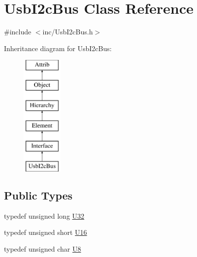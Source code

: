 \hypertarget{classUsbI2cBus}{}\section{Usb\+I2c\+Bus Class Reference}
\label{classUsbI2cBus}


{\ttfamily \#include $<$inc/\+Usb\+I2c\+Bus.\+h$>$}

Inheritance diagram for Usb\+I2c\+Bus\+:\begin{figure}[H]
\begin{center}
\leavevmode
\includegraphics[height=6.000000cm]{classUsbI2cBus}
\end{center}
\end{figure}
\subsection*{Public Types}
\begin{DoxyCompactItemize}
\item 
typedef unsigned long \hyperlink{classUsbI2cBus_a9dfe5e7ebbbbeae2880af6739ae1adb3}{U32}
\item 
typedef unsigned short \hyperlink{classUsbI2cBus_ab9e591a682274de9311c9596ea0482a0}{U16}
\item 
typedef unsigned char \hyperlink{classUsbI2cBus_a06be0e3e19b0f6eee34d3537bb31960e}{U8}
\end{DoxyCompactItemize}
